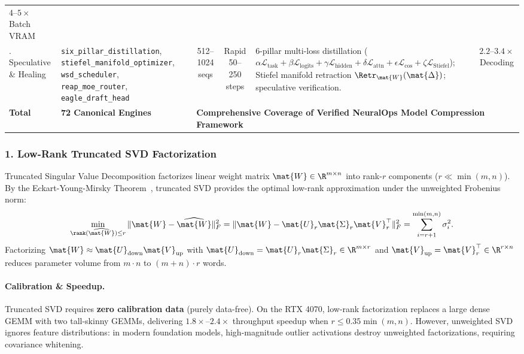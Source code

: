 \begin{table}[t]
{\begin{tabular}{@{}lp{3.8cm}ccp{5.4cm}c@{}}
$4\text{--}5\times$ Batch VRAM \\
\addlinespace[2pt]
8. Speculative \& Healing & 
\texttt{six\_pillar\_distillation}, \texttt{stiefel\_manifold\_optimizer}, \texttt{wsd\_scheduler}, \texttt{reap\_moe\_router}, \texttt{eagle\_draft\_head} & 
512--1024 seqs & 
Rapid 50--250 steps & 
6-pillar multi-loss distillation ($\alpha \mathcal{L}_{\text{task}} + \beta \mathcal{L}_{\text{logits}} + \gamma \mathcal{L}_{\text{hidden}} + \delta \mathcal{L}_{\text{attn}} + \epsilon \mathcal{L}_{\text{cos}} + \zeta \mathcal{L}_{\text{Stiefel}}$); Stiefel manifold retraction $\Retr_\mat{W}(\mat{\Delta})$; speculative verification. & 
$2.2\text{--}3.4\times$ Decoding \\
\midrule
\textbf{Total} & \textbf{72 Canonical Engines} & \multicolumn{4}{l}{\textbf{Comprehensive Coverage of Verified NeuralOps Model Compression Framework}} \\
\bottomrule
\end{tabular}%
}
\end{table}

\subsubsection{1. Low-Rank Truncated SVD Factorization}
\label{subsubsec:svd_factorization}
Truncated Singular Value Decomposition factorizes linear weight matrix $\mat{W} \in \R^{m \times n}$ into rank-$r$ components ($r \ll \min(m, n)$). By the Eckart-Young-Mirsky Theorem~\cite{eckart1936approximation}, truncated SVD provides the optimal low-rank approximation under the unweighted Frobenius norm:
\begin{equation}
\min_{\rank(\widehat{\mat{W}}) \le r} \|\mat{W} - \widehat{\mat{W}}\|_F^2 = \|\mat{W} - \mat{U}_r \mat{\Sigma}_r \mat{V}_r^\top\|_F^2 = \sum_{i=r+1}^{\min(m, n)} \sigma_i^2.
\end{equation}
Factorizing $\mat{W} \approx \mat{U}_{\text{down}} \mat{V}_{\text{up}}$ with $\mat{U}_{\text{down}} = \mat{U}_r \mat{\Sigma}_r \in \R^{m \times r}$ and $\mat{V}_{\text{up}} = \mat{V}_r^\top \in \R^{r \times n}$ reduces parameter volume from $m \cdot n$ to $(m + n) \cdot r$ words.

\paragraph{Calibration \& Speedup.} Truncated SVD requires \textbf{zero calibration data} (purely data-free). On the RTX 4070, low-rank factorization replaces a large dense GEMM with two tall-skinny GEMMs, delivering $1.8\times\text{--}2.4\times$ throughput speedup when $r \le 0.35 \min(m, n)$. However, unweighted SVD ignores feature distributions: in modern foundation models, high-magnitude outlier activations destroy unweighted factorizations, requiring covariance whitening.

